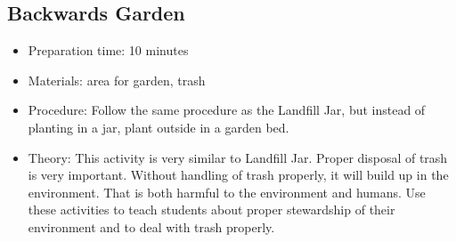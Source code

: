 \subsection{Backwards Garden}
\begin{itemize}
\item{Preparation time: 10 minutes}
\item{Materials: area for garden, trash}
\item{Procedure: Follow the same procedure as the Landfill Jar, but instead of planting in a jar, plant outside in a garden bed. }
\item{Theory: This activity is very similar to Landfill Jar. Proper disposal of trash is very important. Without handling of trash properly, it will build up in the environment. That is both harmful to the environment and humans. Use these activities to teach students about proper stewardship of their environment and to deal with trash properly.}
\end{itemize}
